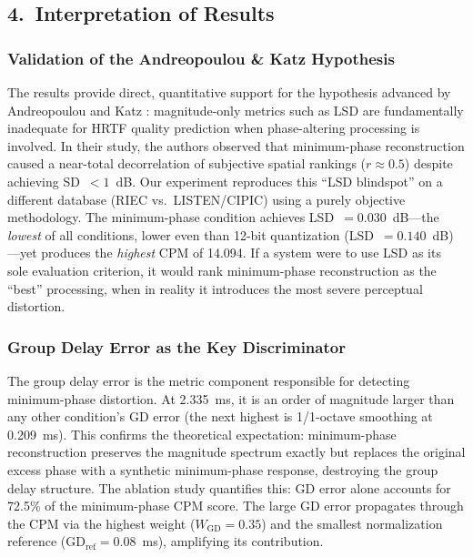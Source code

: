 \documentclass[12pt,a4paper]{article}
\begin{document}
\subsection*{4.\ Interpretation of Results}

\subsubsection*{Validation of the Andreopoulou \& Katz Hypothesis}

The results provide direct, quantitative support for the hypothesis advanced by Andreopoulou and Katz \cite{andreopoulou2022}: magnitude-only metrics such as LSD are fundamentally inadequate for HRTF quality prediction when phase-altering processing is involved. In their study, the authors observed that minimum-phase reconstruction caused a near-total decorrelation of subjective spatial rankings ($r \approx 0.5$) despite achieving SD~$< 1$~dB. Our experiment reproduces this ``LSD blindspot'' on a different database (RIEC vs.\ LISTEN/CIPIC) using a purely objective methodology. The minimum-phase condition achieves LSD~$= 0.030$~dB---the \textit{lowest} of all conditions, lower even than 12-bit quantization (LSD~$= 0.140$~dB)---yet produces the \textit{highest} CPM of 14.094. If a system were to use LSD as its sole evaluation criterion, it would rank minimum-phase reconstruction as the ``best'' processing, when in reality it introduces the most severe perceptual distortion.

\subsubsection*{Group Delay Error as the Key Discriminator}

The group delay error is the metric component responsible for detecting minimum-phase distortion. At 2.335~ms, it is an order of magnitude larger than any other condition's GD error (the next highest is 1/1-octave smoothing at 0.209~ms). This confirms the theoretical expectation: minimum-phase reconstruction preserves the magnitude spectrum exactly but replaces the original excess phase with a synthetic minimum-phase response, destroying the group delay structure. The ablation study quantifies this: GD error alone accounts for 72.5\% of the minimum-phase CPM score. The large GD error propagates through the CPM via the highest weight ($W_{\mathrm{GD}} = 0.35$) and the smallest normalization reference ($\mathrm{GD}_{\mathrm{ref}} = 0.08$~ms), amplifying its contribution.
\end{document}
